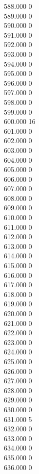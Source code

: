 { 588.000	0 \\
 589.000	0 \\
 590.000	0 \\
 591.000	0 \\
 592.000	0 \\
 593.000	0 \\
 594.000	0 \\
 595.000	0 \\
 596.000	0 \\
 597.000	0 \\
 598.000	0 \\
 599.000	0 \\
 600.000	16 \\
 601.000	0 \\
 602.000	0 \\
 603.000	0 \\
 604.000	0 \\
 605.000	0 \\
 606.000	0 \\
 607.000	0 \\
 608.000	0 \\
 609.000	0 \\
 610.000	0 \\
 611.000	0 \\
 612.000	0 \\
 613.000	0 \\
 614.000	0 \\
 615.000	0 \\
 616.000	0 \\
 617.000	0 \\
 618.000	0 \\
 619.000	0 \\
 620.000	0 \\
 621.000	0 \\
 622.000	0 \\
 623.000	0 \\
 624.000	0 \\
 625.000	0 \\
 626.000	0 \\
 627.000	0 \\
 628.000	0 \\
 629.000	0 \\
 630.000	0 \\
 631.000	5 \\
 632.000	0 \\
 633.000	0 \\
 634.000	0 \\
 635.000	0 \\
 636.000	0 \\
}
